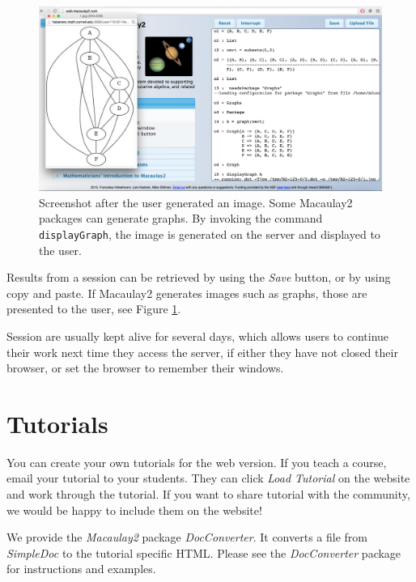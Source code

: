 \documentclass[twocolumn]{article}
\def\M2{{\it Macaulay2}}
\begin{document}
\begin{figure}[htb]
    \includegraphics[width=.95\textwidth]{withGraph.jpg}
    \caption{Screenshot after the user
      generated an image. Some Macaulay2 packages can generate
      graphs. By invoking the command {\tt displayGraph}, the image is
      generated on the server and displayed to the user.}
    \label{fig:graph}
\end{figure}

Results from a session can be retrieved by using the {\it Save}
button, or by using copy and paste. If Macaulay2 generates
images such as graphs, those are presented to the user, see Figure \ref{fig:graph}.


Session are usually kept alive for several days, which allows users to
continue their work next time they access the server, if either they
have not closed their browser, or set the browser to remember their
windows.

\section{Tutorials}

You can create your own tutorials for the web version. If you teach a course,
email your tutorial to your students. They can click
{\it Load Tutorial} on the website and work through the tutorial.
If you want to share tutorial with the community, we would
be happy to include them on the website!

We provide the \M2 package {\it DocConverter}.
It converts a file from {\it SimpleDoc} to the tutorial specific HTML. Please see the
{\it DocConverter} package for instructions and examples.
\end{document}
